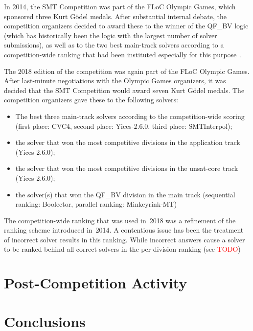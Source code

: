 \documentclass[twoside,11pt]{article}
\newcommand{\TODO}[0]{\textcolor{red}{TODO}}
\begin{document}
In 2014, the SMT Competition was part of the FLoC Olympic Games, which
sponsored three Kurt G\"odel medals.  After substantial internal
debate, the competition organizers decided to award these to the
winner of the QF\_BV logic (which has historically been the logic with
the largest number of solver submissions), as well as to the two best
main-track solvers according to a competition-wide ranking that had
been instituted especially for this
purpose~\cite{DBLP:journals/jsat/CokDW14}.

The 2018 edition of the competition was again part of the FLoC Olympic
Games.  After last-minute negotiations with the Olympic Games
organizers, it was decided that the SMT Competition would award seven
Kurt G\"odel medals.  The competition organizers gave these to the
following solvers:
\begin{itemize}
\item The best three main-track solvers according to the
  competition-wide scoring (first place: CVC4, second place:
  Yices-2.6.0, third place: SMTInterpol);
\item the solver that won the most competitive divisions in the
  application track (Yices-2.6.0);
\item the solver that won the most competitive divisions in the
  unsat-core track (Yices-2.6.0);
\item the solver(s) that won the QF\_BV division in the main track
  (sequential ranking: Boolector, parallel ranking: Minkeyrink-MT)
\end{itemize}

The competition-wide ranking that was used in~2018 was a refinement of
the ranking scheme introduced in~2014.  A contentious issue has been
the treatment of incorrect solver results in this ranking.  While
incorrect answers cause a solver to be ranked behind all correct
solvers in the per-division ranking (see \TODO )


\section{Post-Competition Activity}
\label{sec:post}


\section{Conclusions}
\label{sec:conclusions}


 
\end{document}
